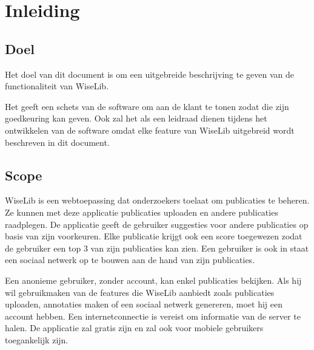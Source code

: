 \section{Inleiding}

\subsection{Doel}

Het doel van dit document is om een uitgebreide beschrijving te geven van de functionaliteit van WiseLib. 

Het geeft een schets van de software om aan de klant te tonen zodat die zijn goedkeuring kan geven. Ook zal het als een leidraad dienen tijdens het ontwikkelen van de software omdat elke feature van WiseLib uitgebreid wordt beschreven in dit document.

\subsection{Scope}

WiseLib is een webtoepassing dat onderzoekers toelaat om publicaties te beheren. Ze kunnen met deze applicatie publicaties uploaden en andere publicaties raadplegen. De applicatie geeft de gebruiker suggesties voor andere publicaties op basis van zijn voorkeuren. Elke publicatie krijgt ook een score toegewezen zodat de gebruiker een top 3 van zijn publicaties kan zien. Een gebruiker is ook in staat een sociaal netwerk op te bouwen aan de hand van zijn publicaties. \newline

Een anonieme gebruiker, zonder account, kan enkel publicaties bekijken. Als hij wil gebruikmaken van de features die WiseLib aanbiedt zoals publicaties uploaden, annotaties maken of een sociaal netwerk genereren, moet hij een account hebben. Een internetconnectie is vereist om informatie van de server te halen. De applicatie zal gratis zijn en zal ook voor mobiele gebruikers toegankelijk zijn. 

